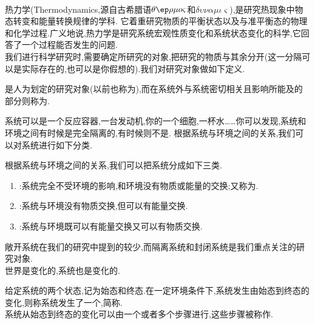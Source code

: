 \documentclass{ctexart}
\begin{document}
\pagestyle{plain}
\noindent{}\vspace{15pt}\\
\indent 热力学(Thermodynamics,源自古希腊语$\theta\ep\rho\mu o\varsigma$和$\delta\upsilon\nu\alpha\mu\iota\varsigma$),是研究热现象中物态转变和能量转换规律的学科.%
它着重研究物质的平衡状态以及与准平衡态的物理和化学过程.广义地说,热力学是研究系统宏观性质变化和系统状态变化的科学,它回答了一个过程能否发生的问题.\vspace{12pt}\\
\indent 我们进行科学研究时,需要确定所研究的对象,把研究的物质与其余分开(这一分隔可以是实际存在的,也可以是你假想的).我们对研究对象做如下定义.
\begin{definition}[2A.1.1 系统与环境]
    是人为划定的研究对象(以前也称为),而在系统外与系统密切相关且影响所能及的部分则称为\footnotemark.
\end{definition}
系统可以是一个反应容器,一台发动机,你的一个细胞,一杯水……你可以发现,系统和环境之间有时候是完全隔离的,有时候则不是.%
根据系统与环境之间的关系,我们可以对系统进行如下分类.
\begin{definition}[2A.1.2 系统的分类]
    根据系统与环境之间的关系,我们可以把系统分成如下三类.
    \begin{enumerate}[label=\tbf{\arabic*.}]
        \item {}:系统完全不受环境的影响,和环境没有物质或能量的交换;又称为.
        \item {}:系统与环境没有物质交换,但可以有能量交换.
        \item {}:系统与环境既可以有能量交换又可以有物质交换.
    \end{enumerate}
\end{definition}
敞开系统在我们的研究中提到的较少,而隔离系统和封闭系统是我们重点关注的研究对象.\vspace{4pt}\\
\indent 世界是变化的,系统也是变化的.
\begin{definition}[2A.1.3 过程与途径]
    给定系统的两个状态,记为始态和终态.在一定环境条件下,系统发生由始态到终态的变化,则称系统发生了一个,简称.\\
    系统从始态到终态的变化可以由一个或者多个步骤进行,这些步骤被称作.
\end{definition}
\end{document}
